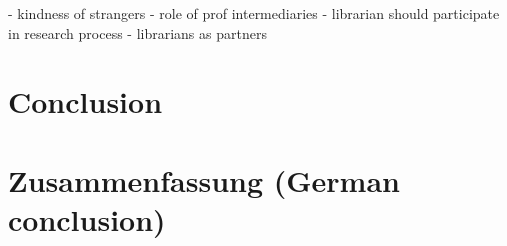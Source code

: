 \documentclass[12pt,a4paper,titlepage,oneside,abstract=true,toc=listof,toc=bibliography]{scrreprt}
\begin{document}
\cite{Constant1996} - kindness of strangers
\cite{Edmond2005} - role of prof intermediaries
\cite{Gunning1978} - librarian should participate in research process
\cite{MonroeGulick2013} - librarians as partners

\chapter{Conclusion}

\chapter{Zusammenfassung (German conclusion)}

 
\cleardoublepage			

%
\end{document}

